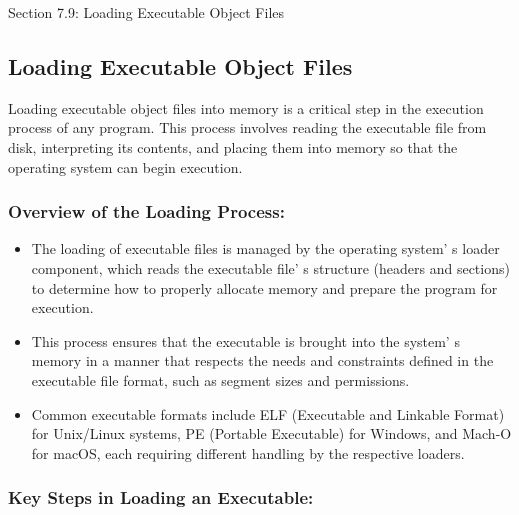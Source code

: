 \begin{notes}{Section 7.9: Loading Executable Object Files}
    \subsection*{Loading Executable Object Files}

    Loading executable object files into memory is a critical step in the execution process of any program. This process involves reading the executable file from disk, interpreting its contents, and 
    placing them into memory so that the operating system can begin execution. \vspace*{1em}
    
    \subsubsection*{Overview of the Loading Process:}
    
    \begin{itemize}
        \item The loading of executable files is managed by the operating system' s loader component, which reads the executable file' s structure (headers and sections) to determine how to properly 
        allocate memory and prepare the program for execution.
        \item This process ensures that the executable is brought into the system' s memory in a manner that respects the needs and constraints defined in the executable file format, such as segment 
        sizes and permissions.
        \item Common executable formats include ELF (Executable and Linkable Format) for Unix/Linux systems, PE (Portable Executable) for Windows, and Mach-O for macOS, each requiring different 
        handling by the respective loaders.
    \end{itemize}
    
    \subsubsection*{Key Steps in Loading an Executable:}
    

\end{notes}
